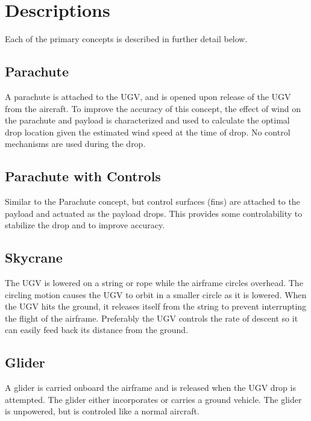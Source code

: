 \documentclass[]{auvsi_doc}
\begin{document}
\begin{AUVSITitlePage}
\begin{artifacttable}
\end{artifacttable}
\end{AUVSITitlePage}


\section{Descriptions}
Each of the primary concepts is described in further detail below. 

\subsection{Parachute}
A parachute is attached to the UGV, and is opened upon release of the UGV from the aircraft. To improve the accuracy of this concept, the effect of wind on the parachute and payload is characterized and used to calculate the optimal drop location given the estimated wind speed at the time of drop. No control mechanisms are used during the drop.

\subsection{Parachute with Controls}
Similar to the Parachute concept, but control surfaces (fins) are attached to the payload and actuated as the payload drops. This provides some controlability to stabilize the drop and to improve accuracy.

\subsection{Skycrane}
The UGV is lowered on a string or rope while the airframe circles overhead. The circling motion causes the UGV to orbit in a smaller circle as it is lowered. When the UGV hits the ground, it releases itself from the string to prevent interrupting the flight of the airframe. Preferably the UGV controls the rate of descent so it can easily feed back its distance from the ground.

\subsection{Glider}
A glider is carried onboard the airframe and is released when the UGV drop is attempted. The glider either incorporates or carries a ground vehicle. The glider is unpowered, but is controled like a normal aircraft. 
\end{document}
